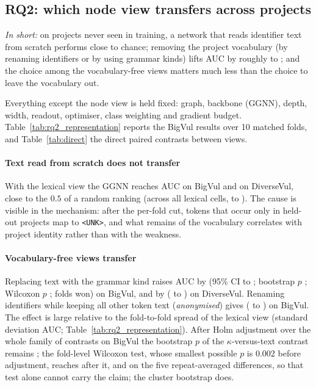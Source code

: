 \subsection{RQ2: which node view transfers across projects}
\label{sec:rq_representation}

\emph{In short:} on projects never seen in training, a network that reads
identifier text from scratch performs close to chance; removing the project
vocabulary (by renaming identifiers or by using grammar kinds) lifts AUC by
roughly \numdeltaMin{} to \numdeltaMax{}; and the choice among the vocabulary-free views matters
much less than the choice to leave the vocabulary out.

Everything except the node view is held fixed: graph, backbone (GGNN), depth,
width, readout, optimiser, class weighting and gradient budget.
Table~\ref{tab:rq2_representation} reports the BigVul results over 10 matched
folds, and Table~\ref{tab:direct} the direct paired contrasts between views.





\paragraph{Text read from scratch does not transfer} With the lexical view
the GGNN reaches AUC \mBvGgnnLexAuc{} on BigVul and \mDvGgnnLexAuc{} on
DiverseVul, close to the $0.5$ of a random ranking (across all lexical cells, \numlexAucMin{} to \numlexAucMax{}). The cause is visible in the
mechanism: after the per-fold cut, tokens that occur only in held-out projects
map to \texttt{<UNK>}, and what remains of the vocabulary correlates with
project identity rather than with the weakness.

\paragraph{Vocabulary-free views transfer} Replacing text with the grammar kind
raises AUC by \cBvGgnnKindVLexD{} (95\% CI \cBvGgnnKindVLexLo{} to
\cBvGgnnKindVLexHi{}; bootstrap $p$ \cBvGgnnKindVLexP{}; Wilcoxon $p$
\cBvGgnnKindVLexW{}; \cBvGgnnKindVLexWins{} folds won) on BigVul, and by
\cDvGgnnKindVLexD{} (\cDvGgnnKindVLexLo{} to \cDvGgnnKindVLexHi{}) on
DiverseVul. Renaming identifiers while keeping all other token text
(\emph{anonymised}) gives \cBvGgnnAnonVLexD{}
(\cBvGgnnAnonVLexLo{} to \cBvGgnnAnonVLexHi{}) on BigVul. The effect is large
relative to the fold-to-fold spread of the lexical view
(standard deviation \numbvGgnnLexicalAucStd{} AUC; Table~\ref{tab:rq2_representation}).
After Holm adjustment over the whole family of contrasts on BigVul the
bootstrap $p$ of the $\kappa$-versus-text contrast remains
\cBvGgnnKindVLexH{}; the fold-level Wilcoxon test, whose smallest possible $p$
is $0.002$ before adjustment, reaches \cBvGgnnKindVLexWH{} after it, and
\cBvGgnnKindVLexWblk{} on the five repeat-averaged differences, so that test
alone cannot carry the claim; the cluster bootstrap does.

